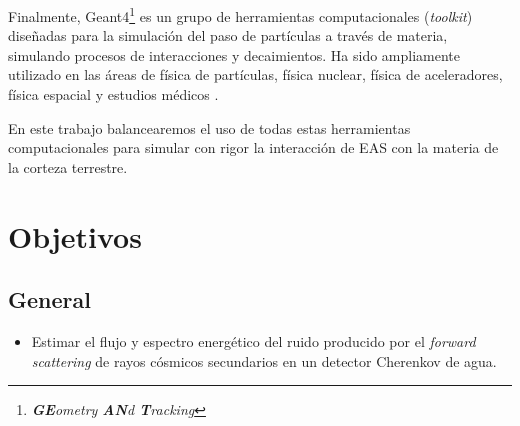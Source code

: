 \documentclass[12pt]{report}
\begin{document}
Finalmente, Geant4\footnote{\textit{\textbf{GE}ometry \textbf{AN}d \textbf{T}racking}} es un grupo de herramientas computacionales (\textit{toolkit}) diseñadas para la simulación del paso de partículas a través de materia, simulando procesos de interacciones y decaimientos. Ha sido ampliamente utilizado en las áreas de física de partículas, física nuclear, física de aceleradores, física espacial y estudios médicos \cite{agostinelli2003geant4}.

En este trabajo balancearemos el uso de todas estas herramientas computacionales para simular con rigor la interacción de EAS con la materia de la corteza terrestre.


















\section*{Objetivos}

\subsection*{General}
\begin{itemize}
    \item Estimar el flujo y espectro energético del ruido producido por el \textit{forward scattering} de rayos cósmicos secundarios en un detector Cherenkov de agua.
\end{itemize}
\end{document}
